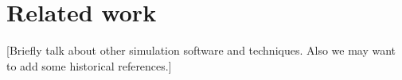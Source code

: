 \chapter{Related work}

[Briefly talk about other simulation software and techniques. Also we may want
to add some historical references.]

